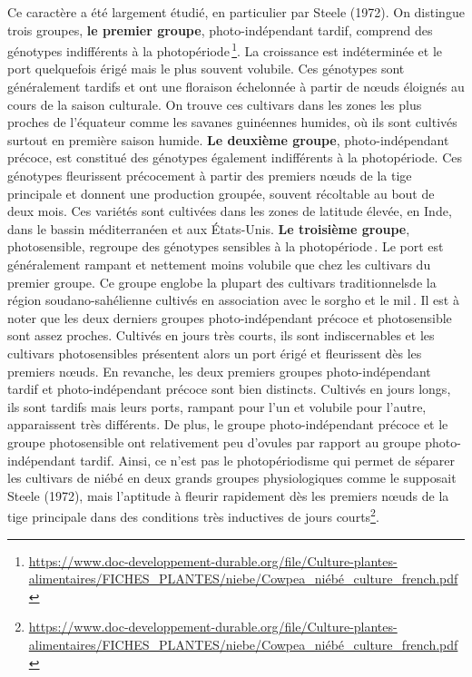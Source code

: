 \documentclass[a4paper,11pt]{article}
\begin{document}
Ce caractère a été largement étudié, en particulier par Steele
(1972). On distingue trois groupes, \textbf{le premier groupe},
photo-indépendant tardif, comprend des génotypes indifférents à la
photopériode\,\footnote{\url{https://www.doc-developpement-durable.org/file/Culture-plantes-alimentaires/FICHES_PLANTES/niebe/Cowpea_niébé_culture_french.pdf}}. La
croissance est indéterminée et le port quelquefois érigé mais le plus
souvent volubile. Ces génotypes sont généralement tardifs et ont une
floraison échelonnée à partir de nœuds éloignés au cours de la saison
culturale. On trouve ces cultivars dans les zones les plus proches de
l’équateur comme les savanes guinéennes humides, où ils sont cultivés
surtout en première saison humide. \textbf{Le deuxième groupe},
photo-indépendant précoce, est constitué des génotypes également
indifférents à la photopériode. Ces génotypes fleurissent précocement
à partir des premiers nœuds de la tige principale et donnent une
production groupée, souvent récoltable au bout de deux mois. Ces
variétés sont cultivées dans les zones de latitude élevée, en Inde,
dans le bassin méditerranéen et aux États-Unis. \textbf{Le troisième
  groupe}, photosensible, regroupe des génotypes sensibles à la
photopériode\,\cite{Steele_1972}. Le port est généralement rampant et
nettement moins volubile que chez les cultivars du premier groupe. Ce
groupe englobe la plupart des cultivars traditionnelsde la région
soudano-sahélienne cultivés en association avec le sorgho et le
mil\,\cite{Doggett_1988}. Il est à noter que les deux derniers groupes
photo-indépendant précoce et photosensible sont assez
proches. Cultivés en jours très courts, ils sont indiscernables et les
cultivars photosensibles présentent alors un port érigé et fleurissent
dès les premiers nœuds. En revanche, les deux premiers groupes
photo-indépendant tardif et photo-indépendant précoce sont bien
distincts. Cultivés en jours longs, ils sont tardifs mais leurs ports,
rampant pour l’un et volubile pour l’autre, apparaissent très
différents. De plus, le groupe photo-indépendant précoce et le groupe
photosensible ont relativement peu d’ovules par rapport au groupe
photo-indépendant tardif. Ainsi, ce n’est pas le photopériodisme qui
permet de séparer les cultivars de niébé en deux grands groupes
physiologiques comme le supposait Steele (1972), mais l’aptitude à
fleurir rapidement dès les premiers nœuds de la tige principale dans
des conditions très inductives de jours
courts\footnote{\url{https://www.doc-developpement-durable.org/file/Culture-plantes-alimentaires/FICHES_PLANTES/niebe/Cowpea_niébé_culture_french.pdf}}.
\end{document}
